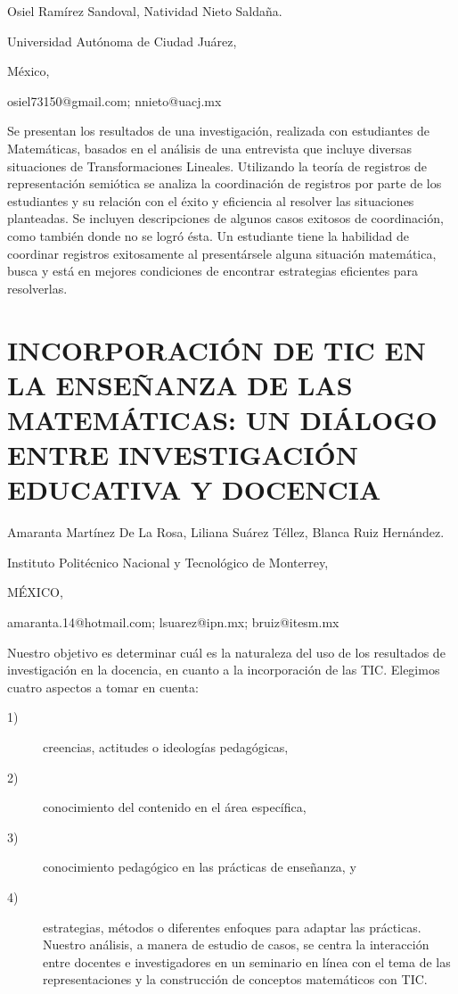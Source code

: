 \begin{datos}

Osiel Ramírez Sandoval, Natividad Nieto Saldaña.

Universidad Autónoma de Ciudad Juárez, 

México,

osiel73150@gmail.com; nnieto@uacj.mx

\end{datos}

Se presentan los resultados de una investigación, realizada con estudiantes
de Matemáticas, basados en el análisis de una entrevista que incluye
diversas situaciones de Transformaciones Lineales. Utilizando la teoría
de registros de representación semiótica se analiza la coordinación
de registros por parte de los estudiantes y su relación con el éxito
y eficiencia al resolver las situaciones planteadas. Se incluyen descripciones
de algunos casos exitosos de coordinación, como también donde no se
logró ésta. Un estudiante tiene la habilidad de coordinar registros
exitosamente al presentársele alguna situación matemática, busca y
está en mejores condiciones de encontrar estrategias eficientes para
resolverlas.


\section{INCORPORACIÓN DE TIC EN LA ENSEÑANZA DE LAS MATEMÁTICAS: UN DIÁLOGO
ENTRE INVESTIGACIÓN EDUCATIVA Y DOCENCIA }

\begin{datos}

Amaranta Martínez De La Rosa, Liliana Suárez Téllez, Blanca Ruiz Hernández.

Instituto Politécnico Nacional y Tecnológico de Monterrey,

MÉXICO,

amaranta.14@hotmail.com; lsuarez@ipn.mx; bruiz@itesm.mx 

\end{datos}

Nuestro objetivo es determinar cuál es la naturaleza del uso de los
resultados de investigación en la docencia, en cuanto a la incorporación
de las TIC. Elegimos cuatro aspectos a tomar en cuenta: 
\begin{description}
\item [{1)}] creencias, actitudes o ideologías pedagógicas, 
\item [{2)}] conocimiento del contenido en el área específica, 
\item [{3)}] conocimiento pedagógico en las prácticas de enseñanza, y
\item [{4)}] estrategias, métodos o diferentes enfoques para adaptar las
prácticas. Nuestro análisis, a manera de estudio de casos, se centra
la interacción entre docentes e investigadores en un seminario en
línea con el tema de las representaciones y la construcción de conceptos
matemáticos con TIC. 
\end{description}

